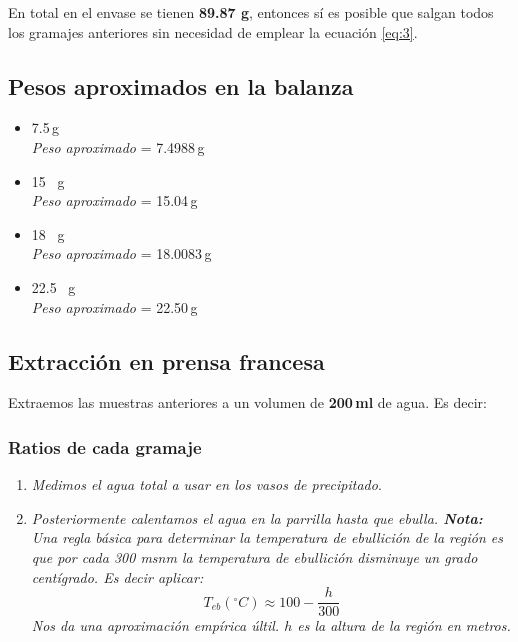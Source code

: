 \documentclass{article}
\begin{document}
En total en el envase se tienen \textbf{89.87 g}, entonces sí es posible que salgan todos los gramajes anteriores sin necesidad de emplear la ecuación \ref{eq:3}. 

\subsection{Pesos aproximados en la balanza}

\begin{itemize}
\item[$\bullet$] 7.5\,g\\
\textit{Peso aproximado} = 7.4988\,g\\
\item[$\bullet$] 15 \, g\\
\textit{Peso aproximado} = 15.04\,g\\
\item[$\bullet$] 18 \, g\\
\textit{Peso aproximado} = 18.0083\,g\\
\item[$\bullet$] 22.5 \, g\\
\textit{Peso aproximado} = 22.50\,g
\end{itemize} 

\subsection{Extracción en prensa francesa}

Extraemos las muestras anteriores a un volumen de\textbf{ 200\,ml} de agua. Es decir:

\subsubsection{Ratios de cada gramaje}

\begin{enumerate}
\item \textit{Medimos el agua total a usar en los vasos de precipitado}.
\item \textit{Posteriormente calentamos el agua en la parrilla hasta que ebulla. \textbf{Nota:} Una regla básica para determinar la temperatura de ebullición de la región es que por cada 300 msnm la temperatura de ebullición disminuye un grado centígrado. Es decir aplicar: \[T_{eb}(^{\circ}C)\approx100 - \frac{h}{300}\] Nos da una aproximación empírica últil. $h$ es la altura de la región en metros.}
\end{enumerate}
\end{document}

